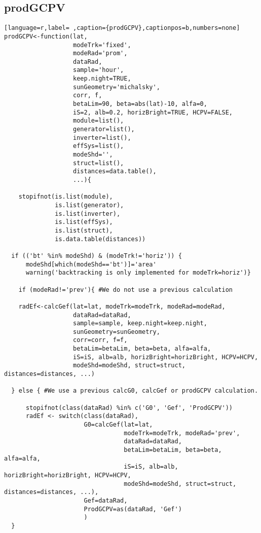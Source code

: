 \subsection{prodGCPV}
\label{sec:org127fe5d}
\label{subsec:prodgcpv}
\begin{lstlisting}[language=r,label= ,caption={prodGCPV},captionpos=b,numbers=none]
prodGCPV<-function(lat,
                   modeTrk='fixed', 
                   modeRad='prom',
                   dataRad,
                   sample='hour',
                   keep.night=TRUE,
                   sunGeometry='michalsky',
                   corr, f,
                   betaLim=90, beta=abs(lat)-10, alfa=0,
                   iS=2, alb=0.2, horizBright=TRUE, HCPV=FALSE,
                   module=list(), 
                   generator=list(),
                   inverter=list(), 
                   effSys=list(), 
                   modeShd='',    
                   struct=list(), 
                   distances=data.table(),
                   ...){

    stopifnot(is.list(module),
              is.list(generator),
              is.list(inverter),
              is.list(effSys),
              is.list(struct),
              is.data.table(distances))

  if (('bt' %in% modeShd) & (modeTrk!='horiz')) {
      modeShd[which(modeShd=='bt')]='area'
      warning('backtracking is only implemented for modeTrk=horiz')}

    if (modeRad!='prev'){ #We do not use a previous calculation

    radEf<-calcGef(lat=lat, modeTrk=modeTrk, modeRad=modeRad,
                   dataRad=dataRad,
                   sample=sample, keep.night=keep.night,
                   sunGeometry=sunGeometry,
                   corr=corr, f=f,
                   betaLim=betaLim, beta=beta, alfa=alfa,
                   iS=iS, alb=alb, horizBright=horizBright, HCPV=HCPV,
                   modeShd=modeShd, struct=struct, distances=distances, ...)

  } else { #We use a previous calcG0, calcGef or prodGCPV calculation.

      stopifnot(class(dataRad) %in% c('G0', 'Gef', 'ProdGCPV'))
      radEf <- switch(class(dataRad),
                      G0=calcGef(lat=lat,
                                 modeTrk=modeTrk, modeRad='prev',
                                 dataRad=dataRad,
                                 betaLim=betaLim, beta=beta, alfa=alfa,
                                 iS=iS, alb=alb, horizBright=horizBright, HCPV=HCPV,
                                 modeShd=modeShd, struct=struct, distances=distances, ...),
                      Gef=dataRad,
                      ProdGCPV=as(dataRad, 'Gef')
                      )
  }



\end{lstlisting}
